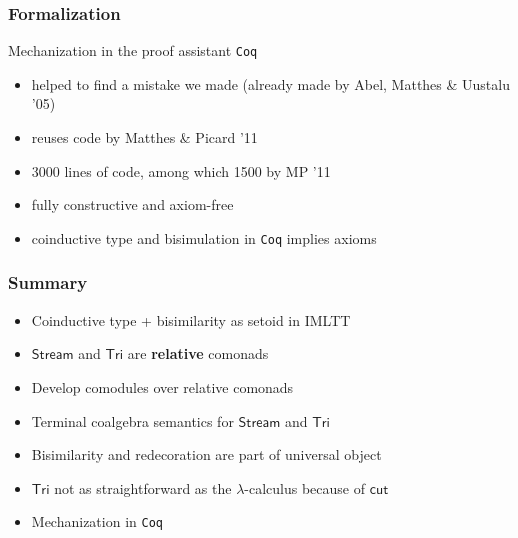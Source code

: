 \documentclass[
]
{beamer}
\newcommand{\constfont}[1]{\ensuremath{\mathsf{#1}}}
\newcommand{\Tri}{\constfont{Tri}}
\newcommand{\stream}{\constfont{Stream}}
\newcommand{\redec}{\constfont{redec}}
\newcommand{\cut}{\constfont{cut}}
\newcommand{\Setoid}{\constfont{Setoid}}
\newcommand{\fat}[1]{\textbf{#1}}
\begin{document}

\begin{comment}
\begin{frame}
 \frametitle{Closing remarks}
 
   \begin{block}{Higher order compatibility}
    Observing that $\Setoid$ is cartesian closed, one can encode
       \[ f \sim g  \Longrightarrow \redec~f \sim \redec~g\]
    in definition of coalgebra for signature of $\Tri$
   \end{block}
\end{frame}
\end{comment}
 
\begin{frame}
  \frametitle{Formalization}
   \begin{block}{Mechanization in the proof assistant \texttt{Coq}}
      \begin{itemize}\setlength{\itemsep}{1em}
       \item helped to find a mistake we made (already made by Abel, Matthes \& Uustalu '05)
       \item reuses code by Matthes \& Picard '11
       \item 3000 lines of code, among which 1500 by MP '11
       \item fully constructive and axiom-free
       \item coinductive type and bisimulation in \texttt{Coq} implies axioms
      \end{itemize}
   \end{block}
   
\end{frame}

\begin{frame}
 \frametitle{Summary}
  
   \begin{itemize}\setlength{\itemsep}{1em}
    \item Coinductive type + bisimilarity as setoid in IMLTT
    \item $\stream$ and $\Tri$ are \fat{relative} comonads
    \item Develop comodules over relative comonads
    \item Terminal coalgebra semantics for $\stream$ and $\Tri$
    \item Bisimilarity and redecoration are part of universal object
    \item $\Tri$ not as straightforward as the $\lambda$-calculus because of $\cut$
    \item Mechanization in \texttt{Coq}
   \end{itemize}

   
\end{frame}
\end{document}
